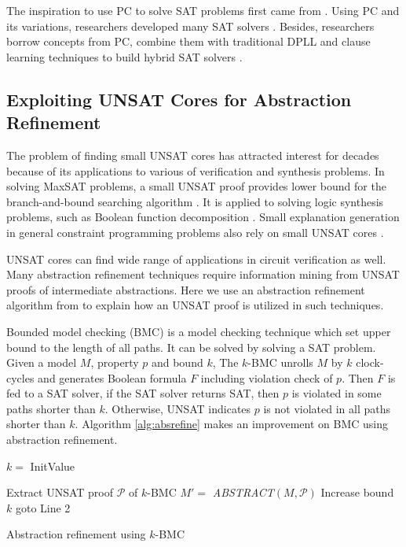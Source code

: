 The inspiration to use PC to solve SAT problems first came from \cite{ceiSTOC96}.
Using PC and its variations, researchers developed many SAT solvers \cite{STABLE,BLUEVERI,PolyBoRi}. 
Besides, researchers borrow concepts from PC, combine them with traditional DPLL and clause learning techniques
to build hybrid SAT solvers \cite{condratTACAS07,Zengler2010}.

\subsection{Exploiting UNSAT Cores for Abstraction Refinement}
The problem of finding small UNSAT cores has attracted interest for decades because of 
its applications to various of verification and synthesis problems.
In solving MaxSAT problems, a small UNSAT proof provides lower bound for the branch-and-bound searching algorithm \cite{li2009maxsat}.
It is applied to solving logic synthesis problems, such as Boolean function decomposition \cite{lee2008bi}. 
Small explanation generation in general constraint programming problems also rely on small UNSAT cores \cite{cambazard2008reformulating}.

UNSAT cores can find wide range of applications in circuit verification as well. Many abstraction refinement techniques require 
information mining from UNSAT proofs of intermediate abstractions. 
Here we use an abstraction refinement algorithm from \cite{zhang2005design} to explain how an UNSAT proof is
utilized in such techniques.

Bounded model checking (BMC) is a model checking technique which set upper bound to the length of all paths. 
It can be solved by solving a SAT problem. Given a model $M$, property $p$ and bound $k$, 
The $k$-BMC unrolls $M$ by $k$ clock-cycles and generates Boolean formula $F$ including violation check of $p$.
Then $F$ is fed to a SAT solver, if the SAT solver returns SAT, then $p$ is violated in 
some paths shorter than $k$. Otherwise, UNSAT indicates $p$ is not violated in all paths 
shorter than $k$. Algorithm \ref{alg:absrefine} makes an improvement on BMC using 
abstraction refinement.

\begin{algorithm}[htb]
\SetAlgoNoLine
\LinesNumbered
  $k = $ InitValue\;
  
  {
  }
  {
	Extract UNSAT proof $\mathcal P$ of $k$-BMC\;
	$M' = $ \textit{ABSTRACT}$(M,\mathcal P)$\;
  }
  {
  }
  {
	Increase bound $k$\;
	goto Line 2\;
  }
\caption {Abstraction refinement using $k$-BMC}\label{alg:absrefine}
\end{algorithm}

